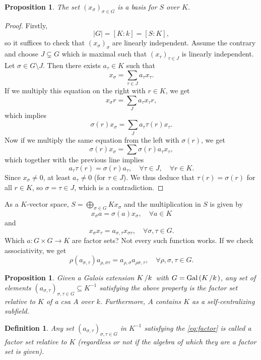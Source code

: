 \documentclass[10pt, a4paper]{article}
\newtheorem{proposition}[thm]{Proposition}
\newtheorem{defi}[thm]{Definition}
\newenvironment{noticeB}{%
  \tcolorbox[%
  notitle,
  empty,
  enhanced,  %
  breakable,
  coltext=black,
  colback=white, 
  fontupper=\rmfamily,
  noparskip,
  sharp corners,
  boxrule=-1pt,  %
  frame hidden,
  left=7pt,  %
  right=7pt,
  top=5pt,
  bottom=5pt,
  before skip=2.5ex plus 2pt,
  after skip=2.5ex plus 2pt,
  borderline west = {1.5pt}{-0.1pt}{blue!30!black}, %
  overlay unbroken and last={%
    \draw[color=black, line width=1.25pt]
    ($(frame.south west)+(1.pt, -0.1pt)$) -- ++(2em, 0);
  }
  ]}
{\endtcolorbox}
\newenvironment{definition}{\begin{noticeB}\begin{defi}}{%
    \end{defi}\end{noticeB}}
\newenvironment{noticeC}{%
  \tcolorbox[%
  notitle,
  empty,
  enhanced,  %
  breakable,
  coltext=black, 
  fontupper=\rmfamily,
  noparskip,
  sharp corners,
  boxrule=-1pt,  %
  frame hidden,
  left=7pt,  %
  right=7pt,
  top=5pt,
  bottom=5pt,
  before skip=2.5ex plus 2pt,
  after skip=2.5ex plus 2pt,
  overlay unbroken and last={%
  },
  ]}
{\endtcolorbox}
\newenvironment{myproof}%
  {\begin{noticeC}\begin{proof}}%
  {\end{proof}\end{noticeC}}
\newcommand{\quot}[2]{{\raisebox{0em}{$#1$}\left/\raisebox{0em}{$#2$}\right.}}
\newcommand{\gal}[1]{\mathrm{Gal}\, {\left(#1\right)}}
\begin{document}
\begin{proposition}
  The set $(x_\sigma)_{\sigma \in G}$ is a basis for $S$ over $K$.
\end{proposition}

\begin{myproof}
  Firstly, 
  $$|G| = [K : k] = [S: K],$$
  so it suffices to check that $(x_\sigma)_\sigma$ are linearly independent.
  Assume the contrary and choose $J \subsetneq G$ which is maximal such that $(x_\tau)_{\tau \in J}$
  is linearly independent.
  Let $\sigma \in G \setminus J$.
  Then there exists $a_{\tau} \in K$ such that 
  $$x_{\sigma} = \sum_{\tau \in J} a_\tau x_\tau.$$
  If we multiply this equation on the right with $r \in K$, we get 
  $$x_\sigma r = \sum_J a_\tau x_\tau r,$$
  which implies 
  $$\sigma (r) x_\sigma = \sum_J a_\tau \tau (r) x_\tau.$$
  Now if we multiply the same equation from the left with $\sigma(r)$, we get 
  $$\sigma(r) x_\sigma = \sum \sigma(r) a_\tau x_\tau,$$
  which together with the previous line implies
  $$a_\tau \tau (r) = \sigma(r) a_\tau,\quad \forall \tau \in J,\quad \forall r \in K.$$
  Since $x_\sigma \neq 0$, at least $a_\tau \neq 0$ (for $\tau \in J$).
  We thus deduce that $\tau (r) = \sigma (r)$ for all $r \in K$, so $\sigma = \tau \in J$,
  which is a contradiction. 
\end{myproof}  
  
As a $K$-vector space, $S = \bigoplus_{\sigma \in G} K x_\sigma$
and the multiplication in $S$ is given by 
$$x_\sigma a = \sigma (a) x_\sigma,\quad  \forall a \in K$$
and 
$$x_\sigma  x_\tau = a_{\sigma, \tau} x_{\sigma \tau},\quad \forall \sigma,\tau \in G.$$
Which $a: G \times G \to K$ are factor sets? Not every such function works.
If we check associativity, we get 
\begin{equation}\label{eq:factor}
  \rho (a_{\sigma, \tau}) a_{\rho, \sigma \tau} = a_{\rho, \sigma}  a_{\rho \sigma, \tau},\quad \forall \rho, \sigma, \tau \in G.
\end{equation}

\begin{proposition}
  Given a Galois extension $\quot{K}{k}$ with $G = \gal{\quot{K}{k}}$,
  any set of elements $(a_{\sigma, \tau})_{\sigma, \tau \in G} \subseteq K^{-1}$
  satisfying the above property is the factor set relative to $K$ 
  of a csa $A$ over $k$. Furthermore, $A$ contains $K$ as a self-centralizing subfield.
\end{proposition}

\begin{definition}
  Any set $(a_{\sigma, \tau})_{\sigma, \tau \in G}$ in $K^{-1}$ satisfying the \eqref{eq:factor} is called a factor set relative to $K$ 
  (regardless or not if the algebra of which they are a factor set is given). 
\end{definition}
\end{document}
